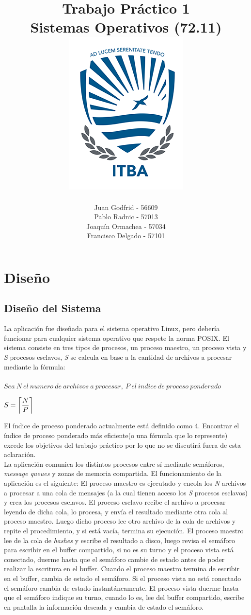 \documentclass[10pt,a4paper]{report}
\title{
	\bf\color{darkcerulean} Trabajo Práctico 1 \\
	\color{black}Sistemas Operativos (72.11) \\
	\includegraphics{itba-escudo2}
	}
\author{Juan Godfrid - 56609 \\Pablo Radnic - 57013 \\ Joaquín Ormachea - 57034\\Francisco Delgado - 57101}
\DeclarePairedDelimiter{\ceil}{\lceil}{\rceil}
\begin{document}
\maketitle

\newpage
\tableofcontents
\newpage


\chapter{Diseño}
\section{Diseño del Sistema}
La aplicación fue diseñada para el sistema operativo Linux, pero debería funcionar para cualquier sistema operativo que respete la norma POSIX. El sistema consiste en tres tipos de procesos, un proceso maestro, un proceso vista y \textit{S} procesos esclavos, \textit{S} se calcula en base a la cantidad de archivos a procesar mediante la fórmula:
\\\\ $Sea\ N\ el\ numero\ de\ archivos\ a\ procesar,\ P\ el\ indice\ de\ proceso\ ponderado\,$
 \begin{center}
  $S = \ceil*{\dfrac{N}{P}}$\\
 \end{center}
\indent El índice de proceso ponderado actualmente está definido como 4. Encontrar el índice de proceso ponderado más eficiente(o una fórmula que lo represente) excede los objetivos del trabajo práctico por lo que no se discutirá fuera de esta aclaración. 
\\ \indent La aplicación comunica los distintos procesos entre sí mediante semáforos, \textit{message queues} y zonas de memoria compartida. El funcionamiento de la aplicación es el siguiente:
El proceso maestro es ejecutado y encola los \textit{N} archivos a procesar a una cola de mensajes (a la cual tienen acceso los \textit{S} procesos esclavos) y crea los procesos esclavos. El proceso esclavo recibe el archivo a procesar leyendo de dicha cola, lo procesa, y envía el resultado mediante otra cola al proceso maestro. Luego dicho proceso lee otro archivo de la cola de archivos y repite el procedimiento, y si está vacía, termina su ejecución. El proceso maestro lee de la cola de \textit{hashes} y escribe el resultado a disco, luego revisa el semáforo para escribir en el buffer compartido, si no es su turno y el proceso vista está conectado, duerme hasta que el semáforo cambie de estado antes de poder realizar la escritura en el buffer. Cuando el proceso maestro termina de escribir en el buffer, cambia de estado el semáforo. Si el proceso vista no está conectado el semáforo cambia de estado instantáneamente. El proceso vista duerme hasta que el semáforo indique su turno, cuando lo es, lee del buffer compartido, escribe en pantalla la información deseada y cambia de estado el semáforo. 
\end{document}
